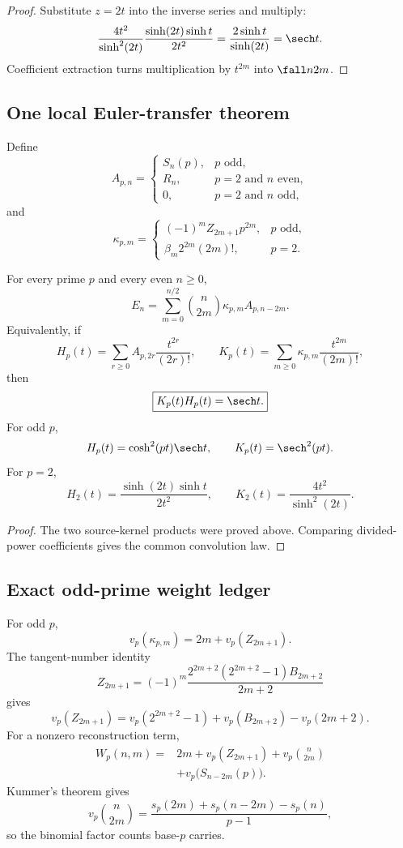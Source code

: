\begin{proof}
Substitute $z=2t$ into the inverse series and multiply:
\[
 \frac{4t^2}{\sinh^2(2t)}\frac{\sinh(2t)\sinh t}{2t^2}
 =\frac{2\sinh t}{\sinh(2t)}=\sech t.
\]
Coefficient extraction turns multiplication by $t^{2m}$ into $\fall n{2m}$.
\end{proof}

\subsection{One local Euler-transfer theorem}
Define
\[
 A_{p,n}=\begin{cases}
 S_n(p),&p\text{ odd},\\
 R_n,&p=2\text{ and }n\text{ even},\\
 0,&p=2\text{ and }n\text{ odd},
 \end{cases}
\]
and
\[
 \kappa_{p,m}=\begin{cases}
 (-1)^mZ_{2m+1}p^{2m},&p\text{ odd},\\
 \beta_m2^{2m}(2m)!,&p=2.
 \end{cases}
\]

\begin{theorem}
For every prime $p$ and every even $n\geq0$,
\[
 \boxed{E_n=\sum_{m=0}^{n/2}\binom n{2m}\kappa_{p,m}A_{p,n-2m}.}
\]
Equivalently, if
\[
 H_p(t)=\sum_{r\geq0}A_{p,2r}\frac{t^{2r}}{(2r)!},
 \qquad
 K_p(t)=\sum_{m\geq0}\kappa_{p,m}\frac{t^{2m}}{(2m)!},
\]
then
\[
 \boxed{K_p(t)H_p(t)=\sech t.}
\]
For odd $p$,
\[
 H_p(t)=\cosh^2(pt)\sech t,
 \qquad K_p(t)=\sech^2(pt).
\]
For $p=2$,
\[
 H_2(t)=\frac{\sinh(2t)\sinh t}{2t^2},
 \qquad K_2(t)=\frac{4t^2}{\sinh^2(2t)}.
\]
\end{theorem}

\begin{proof}
The two source-kernel products were proved above. Comparing divided-power coefficients gives the common convolution law.
\end{proof}

\subsection{Exact odd-prime weight ledger}
For odd $p$,
\[
 v_p(\kappa_{p,m})=2m+v_p(Z_{2m+1}).
\]
The tangent-number identity
\[
 Z_{2m+1}=(-1)^m\frac{2^{2m+2}(2^{2m+2}-1)B_{2m+2}}{2m+2}
\]
gives
\[
 \boxed{v_p(Z_{2m+1})=v_p(2^{2m+2}-1)+v_p(B_{2m+2})-v_p(2m+2).}
\]
For a nonzero reconstruction term,
\[
 \boxed{\begin{aligned}
 W_p(n,m)={}&2m+v_p(Z_{2m+1})+v_p\binom n{2m}\\
 &+v_p\bigl(S_{n-2m}(p)\bigr).
 \end{aligned}}
\]
Kummer's theorem gives
\[
 v_p\binom n{2m}=\frac{s_p(2m)+s_p(n-2m)-s_p(n)}{p-1},
\]
so the binomial factor counts base-$p$ carries.

